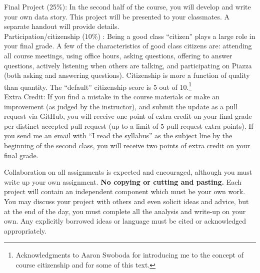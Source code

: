 \documentclass[10pt]{article}
\begin{document}
\noindent Final Project (25\%): In the second half of the course, you will develop and write your own data story. This project will be presented to your classmates. A separate handout will provide details. \\

\noindent Participation/citizenship ($10\%$) : Being a good class ``citizen'' plays a large role in your final grade. A few of the characteristics of good class citizens are: attending all course meetings, using office hours, asking questions, offering to answer questions, actively listening when others are talking, and participating on Piazza (both asking and answering questions). Citizenship is more a function of quality than quantity. The ``default'' citizenship score is 5 out of 10.\footnote{Acknowledgments to Aaron Swoboda for introducing me to the concept of course citizenship and for some of this text.} \\


\noindent Extra Credit: If you find a mistake in the course materials or make an improvement (as judged by the instructor), and submit the update as a pull request via GitHub, you will receive one point of extra credit on your final grade per distinct accepted pull request (up to a limit of 5 pull-request extra points). If you send me an email with ``I read the syllabus'' as the subject line by the beginning of the second class, you will receive two points of extra credit on your final grade. 




\bigskip
{}

Collaboration on all assignments is expected and encouraged, although you must write up your own assignment. {\bf No copying or cutting and pasting.} Each project will contain an independent component which must be your own work. You may discuss your project with others and even solicit ideas and advice, but at the end of the day, you must complete all the analysis and write-up on your own. Any explicitly borrowed ideas or language must be cited or acknowledged appropriately.
\end{document}
